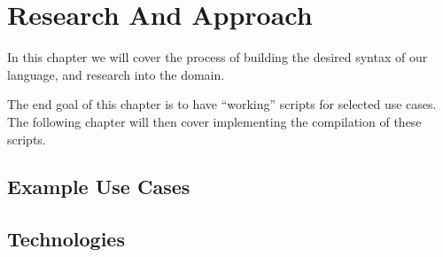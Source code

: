\chapter{Research And Approach}\label{ch:approach}
In this chapter we will cover the process of building the desired syntax of our language, and research into the domain.

The end goal of this chapter is to have ``working'' scripts for selected use cases.
The following chapter will then cover implementing the compilation of these scripts.


\section{Example Use Cases}\label{sec:example-use-cases}


\section{Technologies}

%
%
%
%
%
%
%